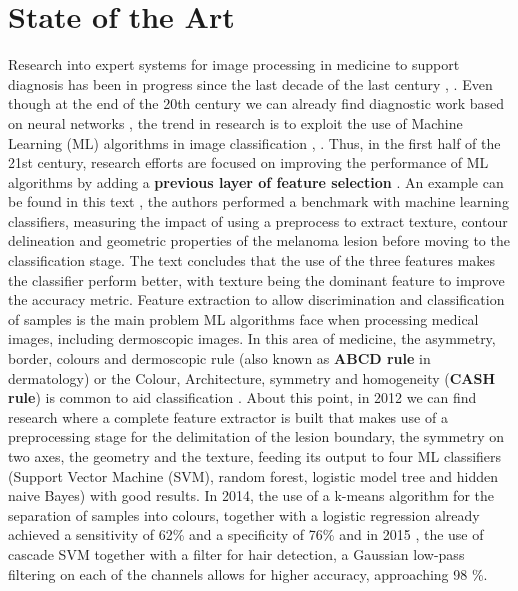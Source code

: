 \chapter{State of the Art}
\label{chapter: State of the Art}

Research into expert systems for image processing in medicine to support diagnosis has been in progress since the last decade of the last century \cite{beuscart_expert_1997}, \cite{chan_expert_1996}. Even though at the end of the 20th century we can already find diagnostic work based on neural networks \cite{wells_medical_1998}, the trend in research is to exploit the use of Machine Learning (ML) algorithms in image classification \cite{dreiseitl_comparison_2001}, \cite{dreiseitl_classifying_2000}. Thus, in the first half of the 21st century, research efforts are focused on improving the performance of ML algorithms by adding a \textbf{previous layer of feature selection} \cite{lee_machine_2009}. An example can be found in this text \cite{garnavi_computer-aided_2012}, the authors performed a benchmark with machine learning classifiers, measuring the impact of using a preprocess to extract texture, contour delineation and geometric properties of the melanoma lesion before moving to the classification stage.  The text concludes that the use of the three features makes the classifier perform better, with texture being the dominant feature to improve the accuracy metric. Feature extraction to allow discrimination and classification of samples is the main problem ML algorithms face when processing medical images, including dermoscopic images. In this area of medicine, the asymmetry, border, colours and dermoscopic rule (also known as \textbf{ABCD rule} in dermatology) or the Colour, Architecture, symmetry and homogeneity (\textbf{CASH rule}) is common to aid classification \cite{lee_machine_2009}. About this point, in 2012 \cite{6263297} we can find research where a complete feature extractor is built that makes use of a preprocessing stage for the delimitation of the lesion boundary, the symmetry on two axes, the geometry and the texture, feeding its output to four ML classifiers (Support Vector Machine (SVM), random forest, logistic model tree and hidden naive Bayes) with good results. In 2014, the use of a k-means algorithm for the separation of samples into colours, together with a logistic regression already achieved a sensitivity of 62\% and a specificity of 76\% \cite{6803866} and in 2015 \cite{abuzaghleh_noninvasive_2015}, the use of cascade SVM together with a filter for hair detection, a Gaussian low-pass filtering on each of the channels allows for higher accuracy, approaching 98 \%.


